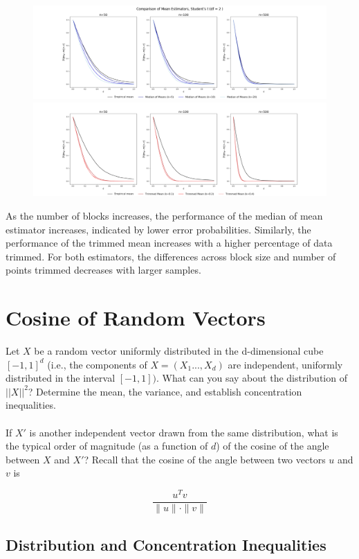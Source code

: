 \documentclass[a4paper, 11pt]{article} %
\begin{document}
\begin{figure}[H]
\centering
\includegraphics[scale=0.25]{Students_MoM_2df}
\includegraphics[scale=0.25]{Students_TrM_2df}
\end{figure}

As the number of blocks increases, the performance of the median of mean estimator increases, indicated by lower error probabilities. Similarly, the performance of the trimmed mean increases with a higher percentage of data trimmed. For both estimators, the differences across block size and number of points trimmed decreases with larger samples. 


\section{Cosine of Random Vectors}

Let $X$ be a random vector uniformly distributed in the d-dimensional cube $[-1, 1]^d$ (i.e., the components of $X = (X_1 . . . , X_d)$ are independent, uniformly distributed in the interval $[-1, 1])$. What can you say about the distribution of $||X||^2$? Determine the mean, the variance, and establish concentration inequalities.\\
\\
If $X'$ is another independent vector drawn from the same distribution, what is the typical
order of magnitude (as a function of $d$) of the cosine of the angle between $X$ and $X'$? Recall that the cosine of the angle between two vectors $u$ and $v$ is

$$\frac { u ^ { T } v } { \| u \| \cdot \| v \| }$$


\subsection{Distribution and Concentration Inequalities}
\end{document}

